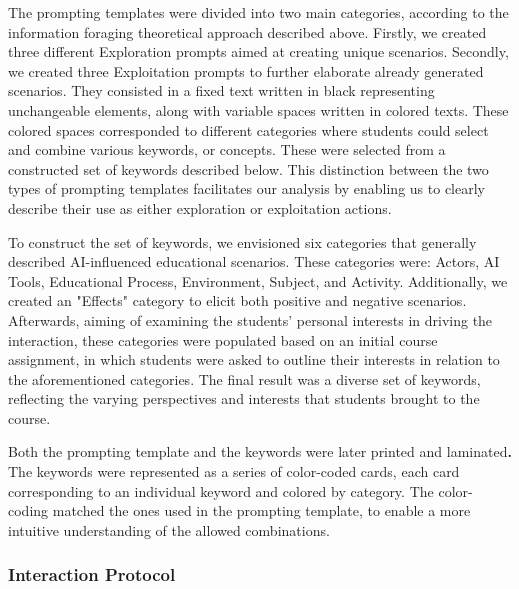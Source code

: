 \documentclass[sn-mathphys, Numbered]{sn-jnl}%
\theoremstyle{thmstyleone}%
\theoremstyle{thmstyletwo}%
\theoremstyle{thmstylethree}%
\begin{document}
The prompting templates were divided into two main categories, according to the information foraging theoretical approach described above. Firstly, we created three different Exploration prompts aimed at creating unique scenarios. Secondly, we created three Exploitation prompts to further elaborate already generated scenarios. They consisted in a fixed text written in black representing unchangeable elements, along with variable spaces written in colored texts. These colored spaces corresponded to different categories where students could select and combine various keywords, or concepts. These were selected from a constructed set of keywords described below. This distinction between the two types of prompting templates facilitates our analysis by enabling us to clearly describe their use as either exploration or exploitation actions.

To construct the set of keywords, we envisioned six categories that generally described AI-influenced educational scenarios. These categories were: Actors, AI Tools, Educational Process, Environment, Subject, and Activity. Additionally, we created an "Effects" category to elicit both positive and negative scenarios. Afterwards, aiming of examining the students' personal interests in driving the interaction, these categories were populated based on an initial course assignment, in which students were asked to outline their interests in relation to the aforementioned categories. The final result was a diverse set of keywords, reflecting the varying perspectives and interests that students brought to the course.

Both the prompting template and the keywords were later printed and laminated\textbf{.} The keywords were represented as a series of color-coded cards, each card corresponding to an individual keyword and colored by category. The color-coding matched the ones used in the prompting template, to enable a more intuitive understanding of the allowed combinations.

\subsubsection*{Interaction Protocol}
\end{document}
